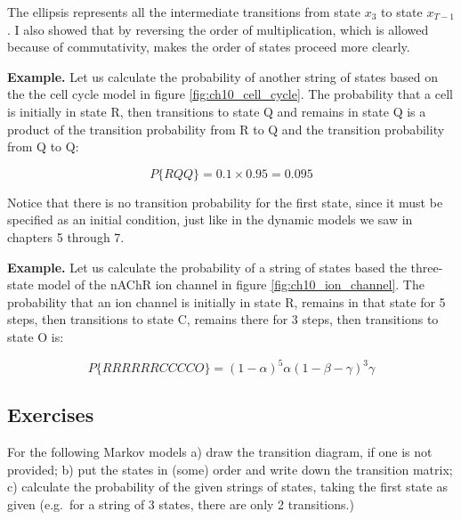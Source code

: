 \documentclass[
  letterpaper,
  DIV=11,
  numbers=noendperiod]{scrreprt}
\begin{document}
The ellipsis represents all the intermediate transitions from state
\(x_3\) to state \(x_{T-1}\). I also showed that by reversing the order
of multiplication, which is allowed because of commutativity, makes the
order of states proceed more clearly.

\textbf{Example.} Let us calculate the probability of another string of
states based on the the cell cycle model in figure
\ref{fig:ch10_cell_cycle}. The probability that a cell is initially in
state R, then transitions to state Q and remains in state Q is a product
of the transition probability from R to Q and the transition probability
from Q to Q:

\[ 
P\{RQQ\} = 0.1 \times 0.95=0.095
\]

Notice that there is no transition probability for the first state,
since it must be specified as an initial condition, just like in the
dynamic models we saw in chapters 5 through 7.

\textbf{Example.} Let us calculate the probability of a string of states
based the three-state model of the nAChR ion channel in figure
\ref{fig:ch10_ion_channel}. The probability that an ion channel is
initially in state R, remains in that state for 5 steps, then
transitions to state C, remains there for 3 steps, then transitions to
state O is:

\[ 
P\{RRRRRRCCCCO\} =  (1-\alpha)^5 \alpha (1-\beta-\gamma)^3 \gamma
\]

\hypertarget{exercises-32}{%
\subsection{Exercises}\label{exercises-32}}

For the following Markov models a) draw the transition diagram, if one
is not provided; b) put the states in (some) order and write down the
transition matrix; c) calculate the probability of the given strings of
states, taking the first state as given (e.g.~for a string of 3 states,
there are only 2 transitions.)
\end{document}
